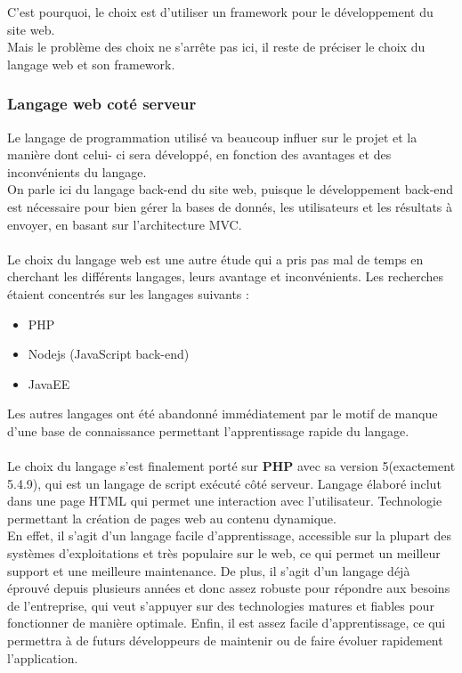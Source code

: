 \documentclass[12pt]{article}
\begin{document}
C'est pourquoi, le choix est d'utiliser un framework pour le développement du site web.\\

Mais le problème des choix ne s’arrête pas ici, il reste de préciser le choix du langage web et son framework.
 
\subsubsection{Langage web coté serveur }
Le langage de programmation utilisé va beaucoup influer sur le projet et la manière dont celui-
ci sera développé, en fonction des avantages et des inconvénients du langage.\\
On parle ici du langage back-end du site web, puisque le développement back-end est nécessaire pour bien gérer 
la bases de donnés, les  utilisateurs et les résultats à envoyer, en basant sur l'architecture MVC.\\ \\
Le choix du langage web est une autre étude qui a pris pas mal de temps en cherchant les différents langages, leurs 
avantage et inconvénients. Les recherches étaient concentrés sur les langages suivants :
\begin{itemize}
\item PHP
\item Nodejs (JavaScript back-end)
\item JavaEE

\end{itemize}

Les autres langages ont été abandonné immédiatement par le motif de manque d'une base de connaissance permettant
l'apprentissage rapide du langage.\\ \\

Le choix du langage s’est finalement porté sur \textbf{PHP} avec sa version 5(exactement 5.4.9), qui 
 est un langage
de script exécuté côté serveur. Langage élaboré inclut dans une page HTML
qui permet une interaction avec l’utilisateur. Technologie permettant la
création de pages web au contenu dynamique.\\

 En effet, il s’agit d’un langage facile
d’apprentissage, accessible sur la plupart des systèmes d’exploitations et très populaire sur le
web, ce qui permet un meilleur support et une meilleure maintenance. De plus, il s’agit d’un
langage déjà éprouvé depuis plusieurs années et donc assez robuste pour répondre aux
besoins de l’entreprise, qui veut s’appuyer sur des technologies matures et fiables pour
fonctionner de manière optimale. Enfin, il est assez facile d’apprentissage, ce qui permettra à
de futurs développeurs de maintenir ou de faire évoluer rapidement l’application.\\  \\
\end{document}
